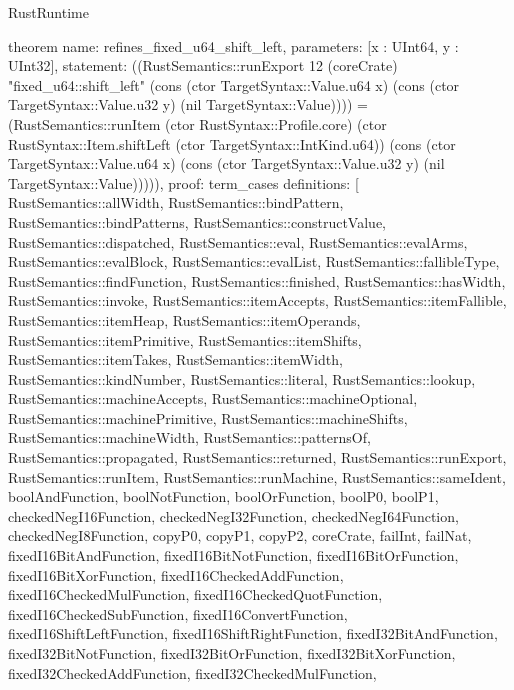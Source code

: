 \begin{lexlean}{RustRuntime}
\begin{semanticmodule}
theorem{
  name: refines_fixed_u64_shift_left,
  parameters: [x : UInt64, y : UInt32],
  statement: ((RustSemantics::runExport 12 (coreCrate) "fixed_u64::shift_left" (cons (ctor TargetSyntax::Value.u64 x) (cons (ctor TargetSyntax::Value.u32 y) (nil TargetSyntax::Value)))) = (RustSemantics::runItem (ctor RustSyntax::Profile.core) (ctor RustSyntax::Item.shiftLeft (ctor TargetSyntax::IntKind.u64)) (cons (ctor TargetSyntax::Value.u64 x) (cons (ctor TargetSyntax::Value.u32 y) (nil TargetSyntax::Value))))),
  proof: term_cases{
    definitions: [
      RustSemantics::allWidth,
      RustSemantics::bindPattern,
      RustSemantics::bindPatterns,
      RustSemantics::constructValue,
      RustSemantics::dispatched,
      RustSemantics::eval,
      RustSemantics::evalArms,
      RustSemantics::evalBlock,
      RustSemantics::evalList,
      RustSemantics::fallibleType,
      RustSemantics::findFunction,
      RustSemantics::finished,
      RustSemantics::hasWidth,
      RustSemantics::invoke,
      RustSemantics::itemAccepts,
      RustSemantics::itemFallible,
      RustSemantics::itemHeap,
      RustSemantics::itemOperands,
      RustSemantics::itemPrimitive,
      RustSemantics::itemShifts,
      RustSemantics::itemTakes,
      RustSemantics::itemWidth,
      RustSemantics::kindNumber,
      RustSemantics::literal,
      RustSemantics::lookup,
      RustSemantics::machineAccepts,
      RustSemantics::machineOptional,
      RustSemantics::machinePrimitive,
      RustSemantics::machineShifts,
      RustSemantics::machineWidth,
      RustSemantics::patternsOf,
      RustSemantics::propagated,
      RustSemantics::returned,
      RustSemantics::runExport,
      RustSemantics::runItem,
      RustSemantics::runMachine,
      RustSemantics::sameIdent,
      boolAndFunction,
      boolNotFunction,
      boolOrFunction,
      boolP0,
      boolP1,
      checkedNegI16Function,
      checkedNegI32Function,
      checkedNegI64Function,
      checkedNegI8Function,
      copyP0,
      copyP1,
      copyP2,
      coreCrate,
      failInt,
      failNat,
      fixedI16BitAndFunction,
      fixedI16BitNotFunction,
      fixedI16BitOrFunction,
      fixedI16BitXorFunction,
      fixedI16CheckedAddFunction,
      fixedI16CheckedMulFunction,
      fixedI16CheckedQuotFunction,
      fixedI16CheckedSubFunction,
      fixedI16ConvertFunction,
      fixedI16ShiftLeftFunction,
      fixedI16ShiftRightFunction,
      fixedI32BitAndFunction,
      fixedI32BitNotFunction,
      fixedI32BitOrFunction,
      fixedI32BitXorFunction,
      fixedI32CheckedAddFunction,
      fixedI32CheckedMulFunction,
}}
\end{semanticmodule}
\end{lexlean}
